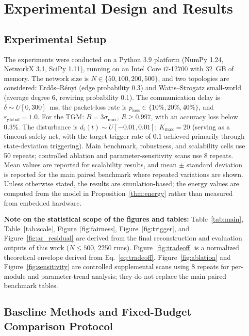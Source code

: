 \documentclass[10pt]{article}
\newcommand{\TGM}{TGM}
\newcommand{\ploss}{p_{\text{loss}}}
\newcommand{\egl}{\varepsilon_{\text{global}}}
\begin{document}

\section{Experimental Design and Results}\label{sec:experiments}

\subsection{Experimental Setup}

The experiments were conducted on a Python 3.9 platform (NumPy 1.24, NetworkX 3.1, SciPy 1.11), running on an Intel Core i7-12700 with 32~GB of memory. The network size is $N\in\{50,100,200,500\}$, and two topologies are considered: Erd\H{o}s--R\'enyi (edge probability 0.3) and Watts--Strogatz small-world (average degree 6, rewiring probability 0.1). The communication delay is $\delta\sim U[0,300]$~ms, the packet-loss rate is $\ploss\in\{10\%,20\%,40\%\}$, and $\egl=1.0$. For the \TGM{}: $B=3\sigma_{\max}$, $R\geq0.997$, with an accuracy loss below $0.3\%$. The disturbance is $d_i(t)\sim U[-0.01,0.01]$; $K_{\max}=20$ (serving as a timeout safety net, with the target trigger rate of $0.1$ achieved primarily through state-deviation triggering). Main benchmark, robustness, and scalability cells use 50 repeats; controlled ablation and parameter-sensitivity scans use 8 repeats. Mean values are reported for scalability results, and mean $\pm$ standard deviation is reported for the main paired benchmark where repeated variations are shown. Unless otherwise stated, the results are simulation-based; the energy values are computed from the model in Proposition~\ref{thm:energy} rather than measured from embedded hardware.

\textbf{Note on the statistical scope of the figures and tables:} Table~\ref{tab:main}, Table~\ref{tab:scale}, Figure~\ref{fig:fairness}, Figure~\ref{fig:trigger}, and Figure~\ref{fig:ar_residual} are derived from the final reconstruction and evaluation outputs of this work ($N{\le}500$, 2250 runs). Figure~\ref{fig:tradeoff} is a normalized theoretical envelope derived from Eq.~\eqref{eq:tradeoff}. Figure~\ref{fig:ablation} and Figure~\ref{fig:sensitivity} are controlled supplemental scans using 8 repeats for per-module and parameter-trend analysis; they do not replace the main paired benchmark tables.

\subsection{Baseline Methods and Fixed-Budget Comparison Protocol}\label{sec:fixed_budget_protocol}
\end{document}
